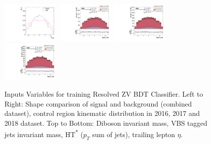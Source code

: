 \begin{figure}[!ht]
  \includegraphics[width=0.25\textwidth]{analysis_plots/tmva_plots/zjj_BDTG14_lep2_eta.pdf} \hspace{-10pt}
  \includegraphics[width=0.25\textwidth]{analysis_plots/2016_zjj/cr_vjets_l/lep2_eta.pdf} \hspace{-10pt}
  \includegraphics[width=0.25\textwidth]{analysis_plots/2017_zjj/cr_vjets_l/lep2_eta.pdf} \hspace{-10pt}
  \includegraphics[width=0.25\textwidth]{analysis_plots/2018_zjj/cr_vjets_l/lep2_eta.pdf} \hspace{-10pt}
  \caption[Inputs Variables for training Resolved ZV BDT Classifier]%
  {Inputs Variables for training Resolved ZV BDT Classifier.
    Left to Right: Shape comparison of signal and background (combined dataset), control region
    kinematic distribution in 2016, 2017 and 2018 dataset.
    Top to Bottom: Diboson invariant mass, VBS tagged jets invariant mass,
    HT\textsuperscript{*} (\( p_{T} \) sum of jets), trailing lepton \( \eta \).}%
  \label{fig:vbs-training-input-zjj}
\end{figure}

